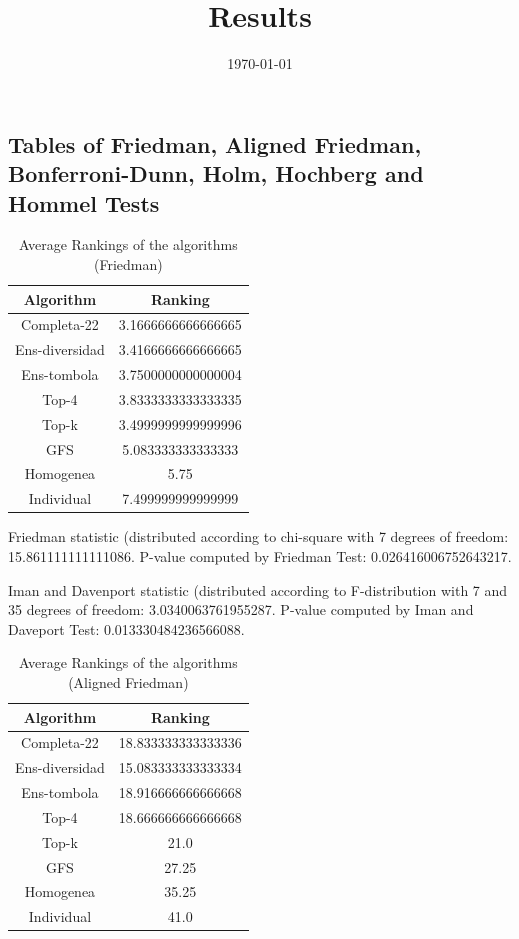 \documentclass[a4paper,10pt]{article}
\title{Results}
\author{}
\date{\today}
\begin{document}
\begin{landscape}
\oddsidemargin 0in \topmargin 0in\maketitle
\section{Tables of Friedman, Aligned Friedman, Bonferroni-Dunn, Holm, Hochberg and Hommel Tests}
\begin{table}[!htp]
\centering
\caption{Average Rankings of the algorithms (Friedman)
}\begin{tabular}{c|c}
Algorithm&Ranking\\
\hline
Completa-22&3.1666666666666665\\
Ens-diversidad&3.4166666666666665\\
Ens-tombola&3.7500000000000004\\
Top-4&3.8333333333333335\\
Top-k&3.4999999999999996\\
GFS&5.083333333333333\\
Homogenea&5.75\\
Individual&7.499999999999999\\
\end{tabular}
\end{table}


Friedman statistic (distributed according to chi-square with 7 degrees of freedom: 15.861111111111086. 
P-value computed by Friedman Test: 0.026416006752643217.\newline

Iman and Davenport statistic (distributed according to F-distribution with 7 and 35 degrees of freedom: 3.0340063761955287. 
P-value computed by Iman and Daveport Test: 0.013330484236566088.\newline


\newpage

\begin{table}[!htp]
\centering
\caption{Average Rankings of the algorithms (Aligned Friedman)
}\begin{tabular}{c|c}
Algorithm&Ranking\\
\hline
Completa-22&18.833333333333336\\
Ens-diversidad&15.083333333333334\\
Ens-tombola&18.916666666666668\\
Top-4&18.666666666666668\\
Top-k&21.0\\
GFS&27.25\\
Homogenea&35.25\\
Individual&41.0\\
\end{tabular}
\end{table}



\end{landscape}
\end{document}
